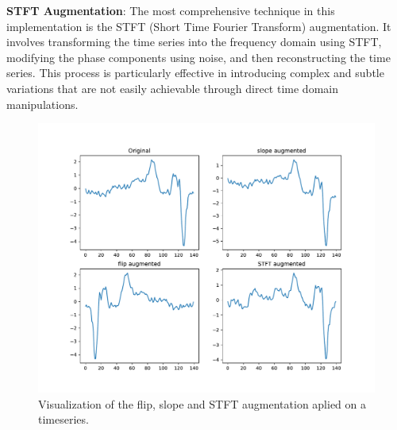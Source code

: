 \textbf{STFT Augmentation}: The most comprehensive technique in this implementation is the STFT (Short Time Fourier Transform) augmentation. It involves transforming the time series into the frequency domain using STFT, modifying the phase components using noise, and then reconstructing the time series. This process is particularly effective in introducing complex and subtle variations that are not easily achievable through direct time domain manipulations.

\begin{figure}[h]
    \includegraphics[scale=0.5]{figures/figure-pdf/Augmentations.pdf}
    \caption{Visualization of the flip, slope and STFT augmentation aplied on a timeseries. }
\end{figure}